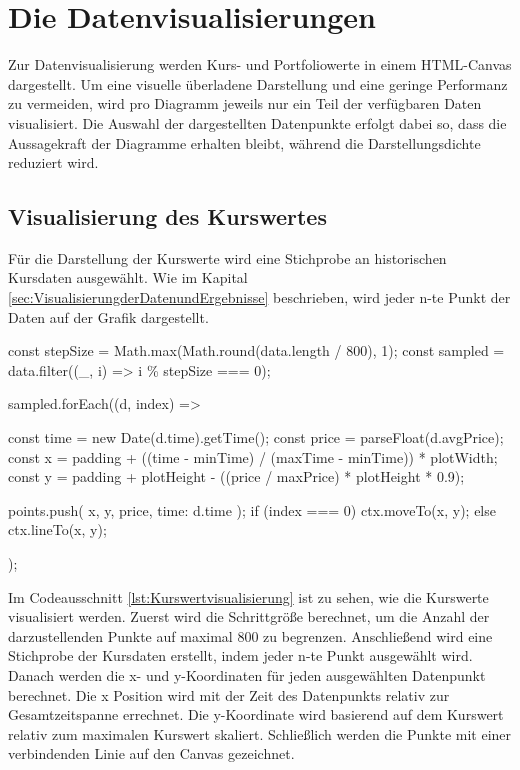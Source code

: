 \section{Die Datenvisualisierungen}
\label{sec:DieDatenvisualisierungen}

Zur Datenvisualisierung werden Kurs- und Portfoliowerte in einem HTML-Canvas dargestellt. 
Um eine visuelle überladene Darstellung und eine geringe Performanz zu vermeiden, wird pro Diagramm jeweils nur ein Teil der verfügbaren Daten visualisiert. 
Die Auswahl der dargestellten Datenpunkte erfolgt dabei so, dass die Aussagekraft der Diagramme erhalten bleibt, während die Darstellungsdichte reduziert wird.

\subsection{Visualisierung des Kurswertes}
\label{subsec:VisualisierungdesKurswertes}

Für die Darstellung der Kurswerte wird eine Stichprobe an historischen Kursdaten ausgewählt.
Wie im Kapital \ref{sec:VisualisierungderDatenundErgebnisse} beschrieben, wird jeder n-te Punkt der Daten auf der Grafik dargestellt.

\begin{JsCode}[caption={Kurswertvisualisierung}, label={lst:Kurswertvisualisierung}]
    const stepSize = Math.max(Math.round(data.length / 800), 1);
    const sampled = data.filter((_, i) => i \% stepSize === 0);

    sampled.forEach((d, index) => {
        const time = new Date(d.time).getTime();
        const price = parseFloat(d.avgPrice);
        const x = padding + ((time - minTime) / (maxTime - minTime)) * plotWidth;
        const y = padding + plotHeight - ((price / maxPrice) * plotHeight * 0.9);

        points.push({ x, y, price, time: d.time });
        if (index === 0) {
            ctx.moveTo(x, y);
        } else {
            ctx.lineTo(x, y);
        }
    });
\end{JsCode}

Im Codeausschnitt \ref{lst:Kurswertvisualisierung} ist zu sehen, wie die Kurswerte visualisiert werden.
Zuerst wird die Schrittgröße berechnet, um die Anzahl der darzustellenden Punkte auf maximal 800 zu begrenzen.
Anschließend wird eine Stichprobe der Kursdaten erstellt, indem jeder n-te Punkt ausgewählt wird.
Danach werden die x- und y-Koordinaten für jeden ausgewählten Datenpunkt berechnet.
Die x Position wird mit der Zeit des Datenpunkts relativ zur Gesamtzeitspanne errechnet.
Die y-Koordinate wird basierend auf dem Kurswert relativ zum maximalen Kurswert skaliert.
Schließlich werden die Punkte mit einer verbindenden Linie auf den Canvas gezeichnet.

